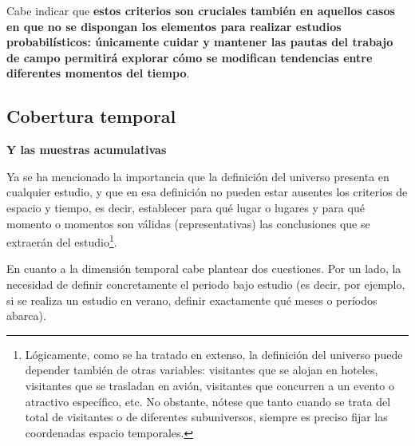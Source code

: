 \documentclass[
]{book}
\begin{document}
Cabe indicar que \textbf{estos criterios son cruciales también en aquellos casos en que no se dispongan los elementos para realizar estudios probabilísticos: únicamente cuidar y mantener las pautas del trabajo de campo permitirá explorar cómo se modifican tendencias entre diferentes momentos del tiempo}.

\hypertarget{cobertura-temporal}{%
\subsection{Cobertura temporal}\label{cobertura-temporal}}

\textbf{Y las muestras acumulativas}

Ya se ha mencionado la importancia que la definición del universo presenta en cualquier estudio, y que en esa definición no pueden estar ausentes los criterios de espacio y tiempo, es decir, establecer para qué lugar o lugares y para qué momento o momentos son válidas (representativas) las conclusiones que se extraerán del estudio\footnote{Lógicamente, como se ha tratado en extenso, la definición del universo puede depender también de otras variables: visitantes que se alojan en hoteles, visitantes que se trasladan en avión, visitantes que concurren a un evento o atractivo específico, etc. No obstante, nótese que tanto cuando se trata del total de visitantes o de diferentes subuniversos, siempre es preciso fijar las coordenadas espacio temporales.}.

En cuanto a la dimensión temporal cabe plantear dos cuestiones. Por un lado, la necesidad de definir concretamente el periodo bajo estudio (es decir, por ejemplo, si se realiza un estudio en verano, definir exactamente qué meses o períodos abarca).
\end{document}
